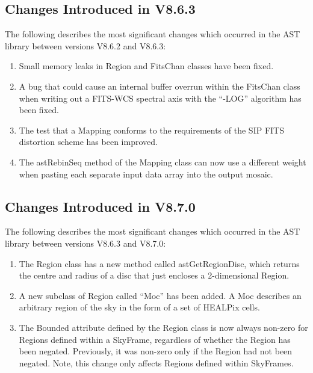 \documentclass[twoside,11pt]{starlink}
\begin{document}
\subsection{Changes Introduced in V8.6.3}
The following describes the most significant changes which
occurred in the AST library between versions V8.6.2 and V8.6.3:

\begin{enumerate}

\item Small memory leaks in Region  and FitsChan classes have been fixed.

\item A bug that could cause an internal buffer overrun within the FitsChan
class when writing out a FITS-WCS spectral axis with the ``-LOG'' algorithm
has been fixed.

\item The test that a Mapping conforms to the requirements of the SIP FITS
distortion scheme has been improved.

\item The astRebinSeq method of the Mapping class can now use a different
weight when pasting each separate input data array into the output mosaic.

\end{enumerate}

\subsection{Changes Introduced in V8.7.0}
The following describes the most significant changes which
occurred in the AST library between versions V8.6.3 and V8.7.0:

\begin{enumerate}

\item The Region class has a new method called astGetRegionDisc, which
returns the centre and radius of a disc that just encloses a
2-dimensional Region.

\item A new subclass of Region called ``Moc'' has been added. A Moc
describes an arbitrary region of the sky in the form of a set of HEALPix
cells.

\item The Bounded attribute defined by the Region class is now always
non-zero for Regions defined within a SkyFrame, regardless of whether the
Region has been negated. Previously, it was non-zero only if the Region
had not been negated. Note, this change only affects Regions defined
within SkyFrames.

\end{enumerate}
\end{document}
